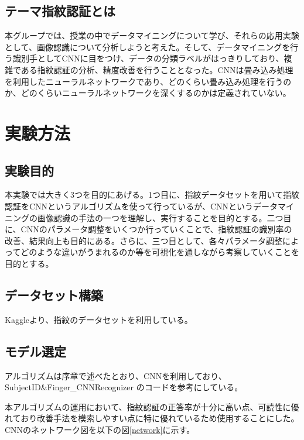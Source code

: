 \documentclass[a4paper, 11pt, titlepage]{jsarticle}
\begin{document}
\subsection{テーマ指紋認証とは}
本グループでは、授業の中でデータマイニングについて学び、それらの応用実験として、画像認識について分析しようと考えた。そして、データマイニングを行う識別手としてCNNに目をつけ、データの分類ラベルがはっきりしており、複雑である指紋認証の分析、精度改善を行うこととなった。CNNは畳み込み処理を利用したニューラルネットワークであり、どのくらい畳み込み処理を行うのか、どのくらいニューラルネットワークを深くするのかは定義されていない。


\section{実験方法}


\subsection{実験目的}
本実験では大きく3つを目的にあげる。1つ目に、指紋データセットを用いて指紋認証をCNNというアルゴリズムを使って行っているが、CNNというデータマイニングの画像認識の手法の一つを理解し、実行することを目的とする。二つ目に、CNNのパラメータ調整をいくつか行っていくことで、指紋認証の識別率の改善、結果向上も目的にある。さらに、三つ目として、各々パラメータ調整によってどのような違いがうまれるのか等を可視化を通しながら考察していくことを目的とする。


\subsection{データセット構築}
Kaggleより、指紋のデータセット\cite{cnn}を利用している。

\subsection{モデル選定}
アルゴリズムは序章で述べたとおり、CNNを利用しており、SubjectID\&Finger\_CNNRecognizer
\cite{algorithm}のコードを参考にしている。

本アルゴリズムの運用において、指紋認証の正答率が十分に高い点、可読性に優れており改善手法を模索しやすい点に特に優れているため使用することにした。CNNのネットワーク図を以下の図\ref{network}に示す。

\clearpage
\end{document}
